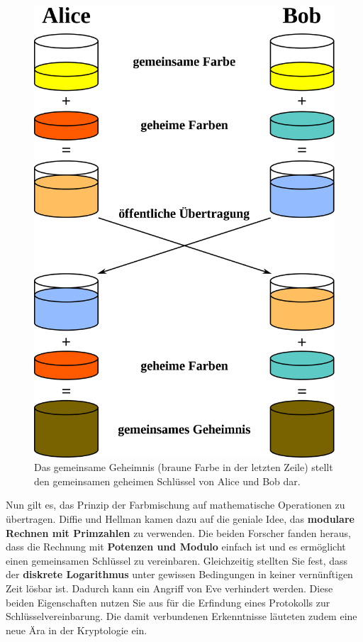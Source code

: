 \begin{figure}[htb]
	\centering
	\includegraphics[scale=0.15]{dhm_schluesselvereinbarung_farben}
	\caption{Das gemeinsame Geheimnis (braune Farbe in der letzten Zeile) stellt den gemeinsamen geheimen Schlüssel von Alice und Bob dar.}
	\label{dhm-schluesselvereinbarung-farben}
\end{figure}

Nun gilt es, das Prinzip der Farbmischung auf mathematische Operationen zu übertragen. Diffie und Hellman kamen dazu auf die geniale Idee, das \textbf{modulare Rechnen mit Primzahlen} zu verwenden. Die beiden Forscher fanden heraus, dass die Rechnung mit \textbf{Potenzen und Modulo} einfach ist und es ermöglicht einen gemeinsamen Schlüssel zu vereinbaren. Gleichzeitig stellten Sie fest, dass der \textbf{diskrete Logarithmus} unter gewissen Bedingungen in keiner vernünftigen Zeit lösbar ist. Dadurch kann ein Angriff von Eve verhindert werden. Diese beiden Eigenschaften nutzen Sie aus für die Erfindung eines Protokolls zur Schlüsselvereinbarung. Die damit verbundenen Erkenntnisse läuteten zudem eine neue Ära in der Kryptologie ein.

